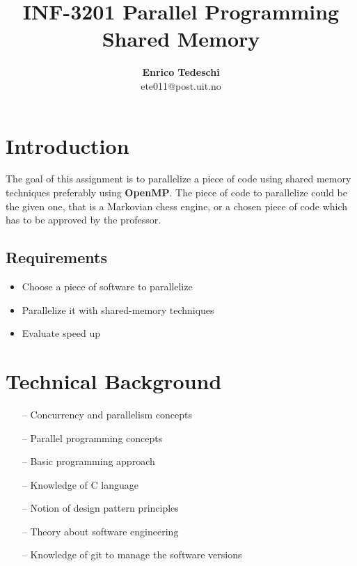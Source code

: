 \documentclass[11pt,conference]{IEEEtran}
\title{INF-3201 Parallel Programming
\newline
Shared Memory}
\author{\textbf{Enrico Tedeschi}\\ ete011@post.uit.no }
\begin{document}
\maketitle

\section{Introduction}
The goal of this assignment is to parallelize a piece of code using shared memory techniques preferably using \textbf{OpenMP}.
\newline
The piece of code to parallelize could be the given one, that is a Markovian chess engine, or a chosen piece of code which has to be approved by the professor.
\subsection{Requirements}
\begin{itemize} 
\item Choose a piece of software to parallelize
\item Parallelize it with shared-memory techniques
\item Evaluate speed up
\end{itemize}

\section{Technical Background}

\begin{itemize} 
\item[--] Concurrency and parallelism concepts
\item[--] Parallel programming concepts
\item[--] Basic programming approach
\item[--] Knowledge of C language
\item[--] Notion of design pattern principles
\item[--] Theory about software engineering
\item[--] Knowledge of git to manage the software versions
\end{itemize}
\end{document}

